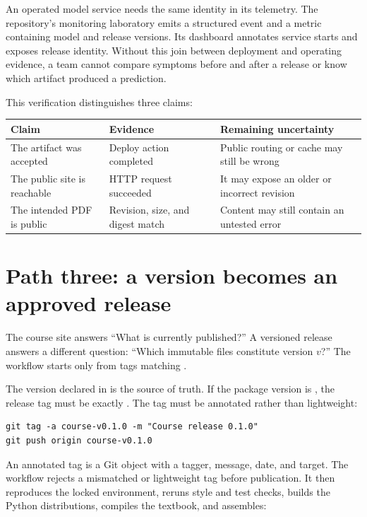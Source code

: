 An operated model service needs the same identity in its telemetry. The
repository's monitoring laboratory emits a  structured
event and a  metric containing model and release
versions. Its dashboard annotates service starts and exposes release identity.
Without this join between deployment and operating evidence, a team cannot
compare symptoms before and after a release or know which artifact produced a
prediction.

This verification distinguishes three claims:

\begin{longtable}{@{}
  >{\raggedright\arraybackslash}p{}
  >{\raggedright\arraybackslash}p{}
  >{\raggedright\arraybackslash}p{}@{}}
\toprule
\textbf{Claim} & \textbf{Evidence} & \textbf{Remaining uncertainty} \\
\midrule
\endhead
The artifact was accepted & Deploy action completed & Public routing or cache
may still be wrong \\
The public site is reachable & HTTP request succeeded & It may expose an older
or incorrect revision \\
The intended PDF is public & Revision, size, and digest match & Content may
still contain an untested error \\
\bottomrule
\end{longtable}

\section{Path three: a version becomes an approved release}

The course site answers ``What is currently published?'' A versioned release
answers a different question: ``Which immutable files constitute version
$v$?'' The  workflow starts only from tags matching
.

The version declared in  is the source of truth. If the
package version is , the release tag must be exactly
. The tag must be annotated rather than lightweight:

\begin{lstlisting}[numbers=none]
git tag -a course-v0.1.0 -m "Course release 0.1.0"
git push origin course-v0.1.0
\end{lstlisting}

An annotated tag is a Git object with a tagger, message, date, and target. The
workflow rejects a mismatched or lightweight tag before publication. It then
reproduces the locked environment, reruns style and test checks, builds the
Python distributions, compiles the textbook, and assembles:

